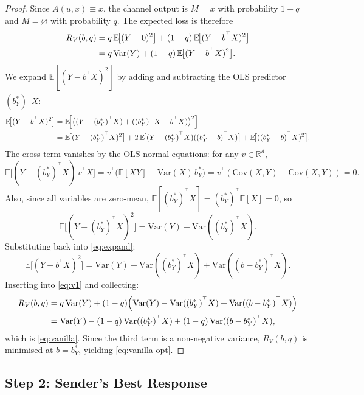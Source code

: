 \documentclass[11pt]{article}
\theoremstyle{definition}
\theoremstyle{remark}
\newcommand{\R}{\mathbb{R}}
\newcommand{\E}{\mathbb{E}}
\newcommand{\T}{^{\top}}
\begin{document}
\begin{proof}
Since $A(u,x)\equiv x$, the channel output is $M=x$ with probability $1-q$ and $M=\varnothing$
with probability $q$.  The expected loss is therefore
\begin{align}
  R_{V}(b,q)
  &= q\,\E\!\bigl[(Y-0)^{2}\bigr]
     + (1-q)\,\E\!\bigl[(Y-b^{\T}X)^{2}\bigr] \notag\\
  &= q\,\mathrm{Var}(Y)
     + (1-q)\,\E\!\bigl[(Y-b^{\T}X)^{2}\bigr]. \label{eq:v1}
\end{align}
We expand $\E[(Y-b^{\T}X)^{2}]$ by adding and subtracting the OLS predictor
$(b_{Y}^{*})^{\T}X$:
\begin{align}
  \E\!\bigl[(Y-b^{\T}X)^{2}\bigr]
  &= \E\!\Bigl[\bigl((Y-(b_{Y}^{*})^{\T}X)
               + ((b_{Y}^{*})^{\T}X - b^{\T}X)\bigr)^{2}\Bigr] \notag\\
  &= \E\!\bigl[(Y-(b_{Y}^{*})^{\T}X)^{2}\bigr]
     + 2\,\E\!\bigl[(Y-(b_{Y}^{*})^{\T}X)((b_{Y}^{*}-b)^{\T}X)\bigr]
     + \E\!\bigl[((b_{Y}^{*}-b)^{\T}X)^{2}\bigr]. \label{eq:expand}
\end{align}
The cross term vanishes by the OLS normal equations: for any $v \in \R^{d}$,
\[
  \E\!\bigl[(Y-(b_{Y}^{*})^{\T}X)\,v^{\T}X\bigr]
  = v^{\T}\bigl(\E[XY] - \mathrm{Var}(X)\,b_{Y}^{*}\bigr)
  = v^{\T}(\mathrm{Cov}(X,Y) - \mathrm{Cov}(X,Y))
  = 0.
\]
Also, since all variables are zero-mean,
$\E[(b_{Y}^{*})^{\T}X] = (b_{Y}^{*})^{\T}\E[X] = 0$, so
\[
  \E\!\bigl[(Y-(b_{Y}^{*})^{\T}X)^{2}\bigr]
  = \mathrm{Var}(Y) - \mathrm{Var}((b_{Y}^{*})^{\T}X).
\]
Substituting back into \eqref{eq:expand}:
\[
  \E\!\bigl[(Y-b^{\T}X)^{2}\bigr]
  = \mathrm{Var}(Y)
    - \mathrm{Var}((b_{Y}^{*})^{\T}X)
    + \mathrm{Var}((b-b_{Y}^{*})^{\T}X).
\]
Inserting into \eqref{eq:v1} and collecting:
\begin{align*}
  R_{V}(b,q)
  &= q\,\mathrm{Var}(Y)
     + (1-q)\Bigl(\mathrm{Var}(Y)
       - \mathrm{Var}((b_{Y}^{*})^{\T}X)
       + \mathrm{Var}((b-b_{Y}^{*})^{\T}X)\Bigr)\\
  &= \mathrm{Var}(Y)
     - (1-q)\,\mathrm{Var}((b_{Y}^{*})^{\T}X)
     + (1-q)\,\mathrm{Var}((b-b_{Y}^{*})^{\T}X),
\end{align*}
which is \eqref{eq:vanilla}.
Since the third term is a non-negative variance, $R_{V}(b,q)$ is minimised at
$b = b_{Y}^{*}$, yielding \eqref{eq:vanilla-opt}.
\end{proof}

\subsection{Step 2: Sender's Best Response}
\end{document}
